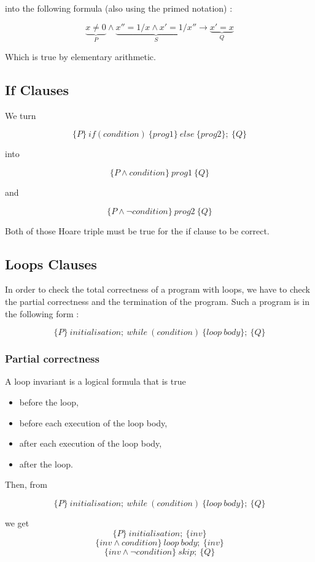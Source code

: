 \documentclass[a4paper,11pt]{report}
\begin{document}
into the following formula (also using the primed notation) :

\[
  \underbrace{x \neq 0}_P \wedge \underbrace{x'' = 1/x \wedge x' = 1/x''}_S \to \underbrace{x' = x}_Q
\]

Which is true by elementary arithmetic.

\subsection{If Clauses}

We turn

\[
  \{P\}\ if(condition)\ \{prog1\}\ else\ \{prog2\};\ \{Q\}
\]

into

\[
  \{P \wedge condition\}\ prog1 \ \{Q\}
\]

and

\[
  \{P \wedge \neg condition\}\ prog2 \ \{Q\}
\]

Both of those Hoare triple must be true for the if clause to be correct.

\subsection{Loops Clauses}

In order to check the total correctness of a program with loops, we have to
check the partial correctness and the termination of the program. Such a program
is in the following form :

\[
  \{P\}\ initialisation;\ while\ (condition)\ \{loop\ body\}; \ \{Q\}
\]

\subsubsection{Partial correctness}

A loop invariant is a logical formula that is true
\begin{itemize}
\item before the loop,
\item before each execution of the loop body,
\item after each execution of the loop body,
\item after the loop.
\end{itemize}

Then, from

\[
  \{P\}\ initialisation;\ while\ (condition)\ \{loop\ body\}; \ \{Q\}
\]

we get
\[ \{P\}\ initialisation; \ \{inv\} \]
\[ \{inv \wedge condition\}\ loop\ body; \ \{inv\} \]
\[ \{inv \wedge \neg condition\}\ skip; \ \{Q\} \]
\end{document}
